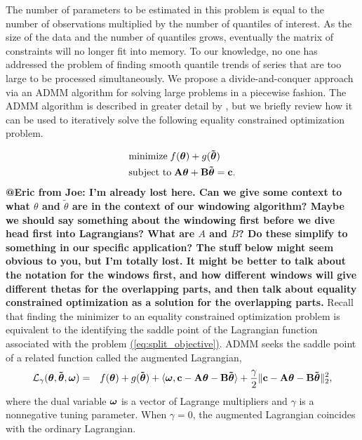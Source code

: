 \documentclass[12pt]{article}
\makeatletter
\newcommand{\Eric}[2]{{\bf {\color{green}@Eric from #1: #2}}\xspace}
\newcommand{\Eqn}[1]{\hyperref[eq:#1]{{\rm (\ref*{eq:#1})}}} %
\newcommand{\Eqn}[1]{{(\ref{eq:#1})}} %
\newcommand{\V}[1]{{\bm{\mathbf{\MakeLowercase{#1}}}}} %
\newcommand{\Vtilde}[1]{{\bm{\tilde \mathbf{\MakeLowercase{#1}}}}} %
\newcommand{\M}[1]{{\bm{\mathbf{\MakeUppercase{#1}}}}} %
\makeatother
\begin{document}
The number of parameters to be estimated in this problem is equal to the number of observations multiplied by the number of quantiles of interest. As the size of the data and the number of quantiles grows, eventually the matrix of constraints will no longer fit into memory. To our knowledge, no one has addressed the problem of finding smooth quantile trends of series that are too large to be processed simultaneously. We propose a divide-and-conquer approach via an ADMM algorithm for solving large problems in a piecewise fashion. The ADMM algorithm \citep{gabay1975dual, glowinski1975approximation} is  described in greater detail by \cite{boyd2011distributed}, but we briefly review how it can be used to iteratively solve the following equality constrained optimization problem.

\begin{equation}
\label{eq:split_objective}
\begin{split}
&\text{minimize} \; f(\V{\theta}) + g(\Vtilde{\theta}) \\
&\text{subject to} \; \M{A}\V{\theta} + \M{B}\Vtilde{\theta} = \V{c}.
\end{split}
\end{equation}
\Eric{Joe}{I'm already lost here. Can we give some context to what $\theta$ and $\widetilde{\theta}$ are in the context of our windowing algorithm? Maybe we should say something about the windowing first before we dive head first into Lagrangians? What are $A$ and $B$? Do these simplify to something in our specific application? The stuff below might seem obvious to you, but I'm totally lost. It might be better to talk about the notation for the windows first, and how different windows will give different thetas for the overlapping parts, and then talk about equality constrained optimization as a solution for the overlapping parts.} Recall that finding the minimizer to an equality constrained optimization problem is equivalent to the identifying the saddle point of the Lagrangian function associated with the problem \Eqn{split_objective}. ADMM seeks the saddle point of a related function called the augmented Lagrangian,
\begin{eqnarray*}
\mathcal{L}_{\gamma}(\V{\theta},\Vtilde{\theta},\V{\omega}) & = & f(\V{\theta}) + g(\Vtilde{\theta}) + \langle \V{\omega}, \V{c} - \M{A}\V{\theta} - \M{B}\Vtilde{\theta} \rangle
+ \frac{\gamma}{2} \lVert \V{c} - \M{A}\V{\theta} - \M{B}\Vtilde{\theta} \rVert_2^2,
\end{eqnarray*}
where the dual variable $\V{\omega}$ is a vector of Lagrange multipliers and $\gamma$ is a nonnegative tuning parameter. When $\gamma = 0$, the augmented Lagrangian coincides with the ordinary Lagrangian.
\end{document}
